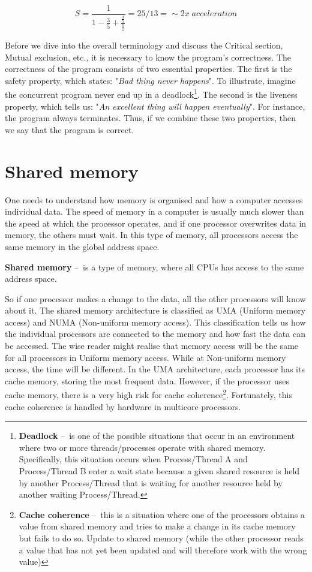 \begin{equation}
    \label{eqn:amdalhinpractice}
    S = \frac{1}{1 - \frac{3}{5} + \frac{\frac{3}{5}}{\frac{5}{1}}} = 25/13 =\sim 2x \; acceleration
    \tag{2}
\end{equation}

Before we dive into the overall terminology and discuss the Critical section, Mutual exclusion, etc., it is necessary to know the program's correctness.
The correctness of the program consists of two essential properties.
The first is the safety property, which states: "\emph{Bad thing never happens}". To illustrate, imagine the concurrent program never end up in a deadlock\footnote{\textbf{Deadlock} \---\ is one of the possible situations that occur in an environment where two or more threads/processes operate with shared memory. Specifically, this situation occurs when Process/Thread A and Process/Thread B enter a wait state because a given shared resource is held by another Process/Thread that is waiting for another resource held by another waiting Process/Thread.}.
The second is the liveness property, which tells us: "\emph{An excellent thing will happen eventually}". For instance, the program always terminates.
Thus, if we combine these two properties, then we say that the program is correct.

\section{Shared memory}
\label{04:sharedmemory}

One needs to understand how memory is organised and how a computer accesses individual data.
The speed of memory in a computer is usually much slower than the speed at which the processor operates, and if one processor overwrites data in memory, the others must wait.
In this type of memory, all processors access the same memory in the global address space.
\begin{definition}
    \textbf{Shared memory} \---\ is a type of memory, where all CPUs has access to the same address space.
\end{definition}
So if one processor makes a change to the data, all the other processors will know about it.
The shared memory architecture is classified as UMA (Uniform memory access) and NUMA (Non-uniform memory access).
This classification tells us how the individual processors are connected to the memory and how fast the data can be accessed.
The wise reader might realise that memory access will be the same for all processors in Uniform memory access.
While at Non-uniform memory access, the time will be different.
In the UMA architecture, each processor has its cache memory, storing the most frequent data.
However, if the processor uses cache memory, there is a very high risk for cache coherence\footnote {\textbf{Cache coherence} \---\ this is a situation where one of the processors obtains a value from shared memory and tries to make a change in its cache memory but fails to do so. Update to shared memory (while the other processor reads a value that has not yet been updated and will therefore work with the wrong value)}. Fortunately, this cache coherence is handled by hardware in multicore processors.

